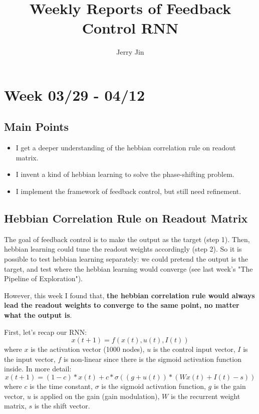 \documentclass[12pt, a4paper]{article}
\title{Weekly Reports of Feedback Control RNN}
\author{Jerry Jin}
\begin{document}
\maketitle

\section*{Week 03/29 - 04/12}

\subsection*{Main Points}

\noindent
\begin{itemize}
    \item I get a deeper understanding of the hebbian correlation rule on readout matrix.
    \item I invent a kind of hebbian learning to solve the phase-shifting problem.
    \item I implement the framework of feedback control, but still need refinement.

\end{itemize}

\newpage

\subsection*{Hebbian Correlation Rule on Readout Matrix}

The goal of feedback control is to make the output as the target (step 1). Then, hebbian learning could tune the readout weights accordingly (step 2). So it is possible to test hebbian learning separately: we could pretend the output is the target, and test where the hebbian learning would converge (see last week's "The Pipeline of Exploration").

However, this week I found that, \textbf{the hebbian correlation rule would always lead the readout weights to converge to the same point, no matter what the output is}.

First, let's recap our RNN:
$$x(t+1) = f(x(t), u(t), I(t))$$
where $x$ is the activation vector (1000 nodes), $u$ is the control input vector, $I$ is the input vector, $f$ is non-linear since there is the sigmoid activation function inside. In more detail:
$$x(t+1) = (1-c)*x(t) + c*\sigma((g+u(t)) * (Wx(t) + I(t) - s))$$
where $c$ is the time constant, $\sigma$ is the sigmoid activation function, $g$ is the gain vector, $u$ is applied on the gain (gain modulation), $W$ is the recurrent weight matrix, $s$ is the shift vector.
\end{document}
